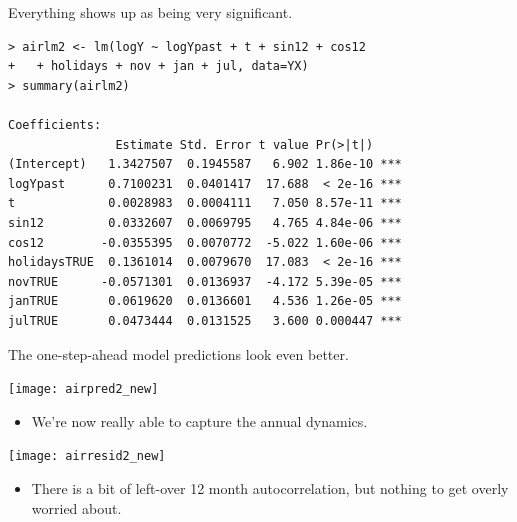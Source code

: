 \documentclass[12pt,xcolor=svgnames]{beamer}
\newcommand{\bl}{\color{blue}}
\newcommand{\nochap}{\vspace{0.5cm}}
\newcommand{\nsk}{\vspace{-.4cm}}
\begin{document}
\begin{frame}[fragile]
\nochap

\vspace{-0.15cm}
Everything shows up as being very significant.

{\bl \footnotesize
\begin{verbatim}
> airlm2 <- lm(logY ~ logYpast + t + sin12 + cos12
+   + holidays + nov + jan + jul, data=YX)
> summary(airlm2)

Coefficients:
               Estimate Std. Error t value Pr(>|t|)    
(Intercept)   1.3427507  0.1945587   6.902 1.86e-10 ***
logYpast      0.7100231  0.0401417  17.688  < 2e-16 ***
t             0.0028983  0.0004111   7.050 8.57e-11 ***
sin12         0.0332607  0.0069795   4.765 4.84e-06 ***
cos12        -0.0355395  0.0070772  -5.022 1.60e-06 ***
holidaysTRUE  0.1361014  0.0079670  17.083  < 2e-16 ***
novTRUE      -0.0571301  0.0136937  -4.172 5.39e-05 ***
janTRUE       0.0619620  0.0136601   4.536 1.26e-05 ***
julTRUE       0.0473444  0.0131525   3.600 0.000447 ***
\end{verbatim}
}

\end{frame}

\begin{frame}
\nochap

\vspace{-0.15cm}
The one-step-ahead model predictions look even better.
\begin{center}
\texttt{[image: airpred2\_new]}
\end{center}

\nsk
\begin{itemize}
\item We're now really able to capture the annual dynamics.
\end{itemize}

\end{frame}

\begin{frame}
\nochap

\nsk
\begin{center}
\texttt{[image: airresid2\_new]}
\end{center}

\nsk
\begin{itemize}
\item There is a bit of left-over 12 month autocorrelation, 
but nothing to get overly worried about.
\end{itemize}

\end{frame}
\end{document}
